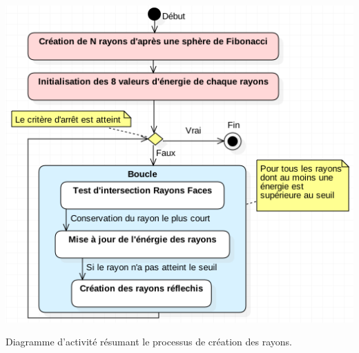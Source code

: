 \begin{figureth}
	\includegraphics[width=0.7\linewidth]{images/DiagRay}
	\caption{Diagramme d'activité résumant le processus de création des rayons.}
	\label{DiagRay}
\end{figureth}

